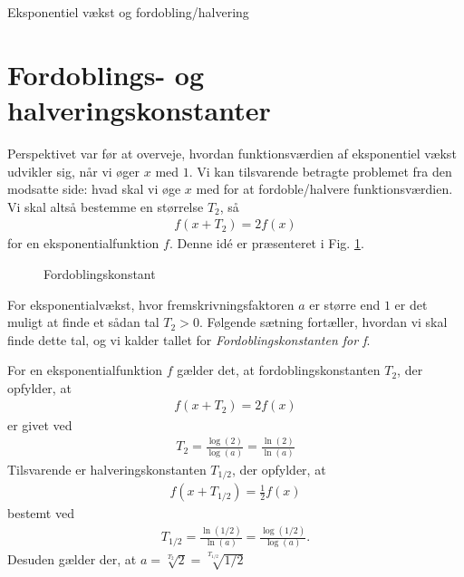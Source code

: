 
\begin{center}
\Huge
Eksponentiel vækst og fordobling/halvering
\end{center}
\section*{Fordoblings- og halveringskonstanter}
Perspektivet var før at overveje, hvordan funktionsværdien af eksponentiel vækst udvikler sig, når vi øger $x$ med $1$. Vi kan tilsvarende betragte problemet fra den modsatte side: hvad skal vi øge $x$ med for at fordoble/halvere funktionsværdien. Vi skal altså bestemme en størrelse $T_2$, så 
\begin{align*}
f(x+T_2) = 2f(x)
\end{align*}
for en eksponentialfunktion $f$. Denne idé er præsenteret i Fig. \ref{fig:Fordobling}. 
\begin{figure}[H]
\center
{}
\caption{Fordoblingskonstant}
\label{fig:Fordobling}

\end{figure}
For eksponentialvækst, hvor fremskrivningsfaktoren $a$ er større end $1$ er det muligt at finde et sådan tal $T_2>0$. Følgende sætning fortæller, hvordan vi skal finde dette tal, og vi kalder tallet for \textit{Fordoblingskonstanten for f}.
\begin{setn}
For en eksponentialfunktion $f$ gælder det, at fordoblingskonstanten $T_2$, der opfylder, at
\begin{align*}
f(x+T_2) = 2f(x)
\end{align*}
er givet ved 
\begin{align*}
T_2 = \frac{\log(2)}{\log(a)} = \frac{\ln(2)}{\ln(a)}
\end{align*}
Tilsvarende er halveringskonstanten $T_{1/2}$, der opfylder, at 
\begin{align*}
f(x+T_{1/2}) = \frac{1}{2}f(x)
\end{align*}
bestemt ved
\begin{align*}
T_{1/2} = \frac{\ln(1/2)}{\ln(a)} = \frac{\log(1/2)}{\log(a)}.
\end{align*}
Desuden gælder der, at $a = \sqrt[T_2]{2}= \sqrt[T_{1/2}]{1/2}$
\end{setn}
